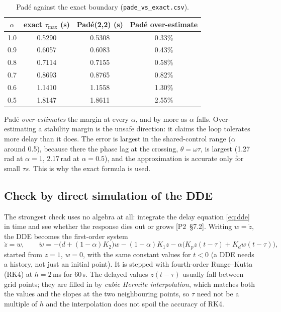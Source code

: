 \documentclass[11pt,a4paper]{article}
\newcommand{\ptwo}[1]{{\small\textsf{[P2~\S#1]}}}
\newcommand{\code}[1]{\texttt{#1}}
\theoremstyle{definition}
\begin{document}
\begin{table}[H]
\centering\small
\begin{tabular}{@{}cccc@{}}
\toprule
$\alpha$ & exact $\tau_{\max}$ (s) & Pad\'e(2,2) (s) & Pad\'e over-estimate \\
\midrule
1.0 & 0.5290 & 0.5308 & 0.33\% \\
0.9 & 0.6057 & 0.6083 & 0.43\% \\
0.8 & 0.7114 & 0.7155 & 0.58\% \\
0.7 & 0.8693 & 0.8765 & 0.82\% \\
0.6 & 1.1410 & 1.1558 & 1.30\% \\
0.5 & 1.8147 & 1.8611 & 2.55\% \\
\bottomrule
\end{tabular}
\caption{Pad\'e against the exact boundary (\code{pade\_vs\_exact.csv}).}
\label{tab:pade}
\end{table}

Pad\'e \emph{over-estimates} the margin at every $\alpha$, and by more as
$\alpha$ falls. Over-estimating a stability margin is the unsafe
direction: it claims the loop tolerates more delay than it does. The
error is largest in the shared-control range ($\alpha$ around 0.5),
because there the phase lag at the crossing, $\theta = \omega\tau$, is
largest (1.27\,rad at $\alpha = 1$, 2.17\,rad at $\alpha = 0.5$), and
the approximation is accurate only for small $\tau s$. This is why the exact formula is
used.

\subsection{Check by direct simulation of the DDE}
The strongest check uses no algebra at all: integrate the delay equation
\eqref{eq:dde} in time and see whether the response dies out or grows
\ptwo{7.2}. Writing $w = \dot z$, the DDE becomes the first-order system
\[
\dot z = w,\qquad
\dot w = -\bigl(d + (1-\alpha)K_2\bigr)w - (1-\alpha)K_1 z
         - \alpha\bigl(K_p z(t-\tau) + K_d w(t-\tau)\bigr),
\]
started from $z = 1$, $w = 0$, with the same constant values for
$t < 0$ (a DDE needs a history, not just an initial point). It is
stepped with fourth-order Runge--Kutta (RK4) at $h = 2$\,ms for 60\,s.
The delayed values $z(t-\tau)$ usually fall between grid points; they
are filled in by \emph{cubic Hermite interpolation}, which matches both
the values and the slopes at the two neighbouring points, so $\tau$ need
not be a multiple of $h$ and the interpolation does not spoil the
accuracy of RK4.
\end{document}
